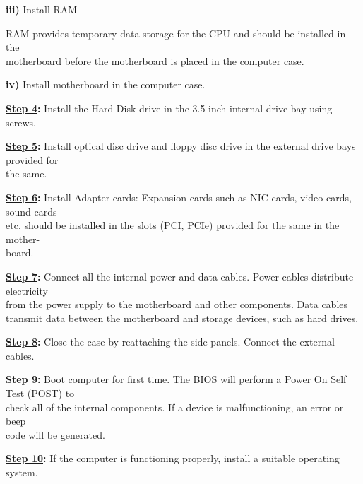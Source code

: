 \documentclass[a4paper,28pt]{report}
\begin{document}
\hspace{40pt}\textbf{iii)} Install RAM

\hspace{50pt}  RAM provides temporary data storage for the CPU and should be installed in the\\\hspace*{50pt}  motherboard before the motherboard is placed in the computer case.

\hspace{40pt}\textbf{iv)} Install motherboard in the computer case.


\textbf{\underline{Step 4}:} Install the Hard Disk drive in the 3.5 inch internal drive bay using screws.


\textbf{\underline{Step 5}:} Install optical disc drive and floppy disc drive in the external drive bays provided for\\\hspace*{40pt}the same.


\textbf{\underline{Step 6}:} Install Adapter cards: Expansion cards such as NIC cards, video cards, sound cards\\\hspace*{40pt}etc. should be installed in the slots (PCI, PCIe) provided for the same in the mother-\\\hspace*{40pt}board.


\textbf{\underline{Step 7}:} Connect all the internal power and data cables. Power cables distribute electricity \\\hspace*{40pt}from the power supply to the motherboard and other components. Data cables\\\hspace*{40pt}transmit data between the motherboard and storage devices, such as hard drives.


\textbf{\underline{Step 8}:} Close the case by reattaching the side panels. Connect the external cables.


\textbf{\underline{Step 9}:} Boot computer for first time. The BIOS will perform a Power On Self Test (POST) to\\\hspace*{40pt}check all of the internal components. If a device is malfunctioning, an error or beep\\\hspace*{40pt}code will be generated.


\textbf{\underline{Step 10}:} If the computer is functioning properly, install a suitable operating system.
\end{document}
